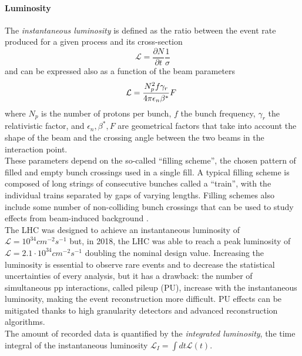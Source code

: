 \paragraph*{Luminosity}
The \emph{instantaneous luminosity} is defined as the ratio between the event rate produced for a given process and its cross-section
\begin{equation}
    \mathcal{L} = \frac{\partial N}{\partial t} \frac{1}{\sigma} 
\end{equation}
and can be expressed also as a function of the beam parameters
\begin{equation}
    \mathcal{L}=\frac{N_{p}^{2}f\gamma_{r}}{4\pi\epsilon_{n}\beta\sp{\ast}}F\ 
\end{equation}
where $N_p$ is the number of protons per bunch, $f$ the bunch frequency, $\gamma_r$ the relativistic factor, and $\epsilon_n, \beta^*, F$ are geometrical factors that take into account the shape of the beam and the crossing angle between the two beams in the interaction point.\\
These parameters depend on the so-called “filling scheme”, the chosen pattern of filled and empty bunch crossings used in a single fill.
A typical filling scheme is composed of long strings of consecutive bunches called a “train”, with the individual trains separated by gaps of varying lengths. Filling schemes also include some number of non-colliding bunch crossings that can be used to study effects from beam-induced background \cite{CMSCollaboration2021PrecisionCMS}.\\
The LHC was designed to achieve an instantaneous luminosity of $\mathcal{L}=10^{34} cm^{-2}s^{-1}$ but, in 2018, the LHC was able to reach a peak luminosity of $\mathcal{L}=2.1 \cdot 10^{34} cm^{-2}s^{-1}$ doubling the nominal design value. Increasing the luminosity is essential to observe rare events and to decrease the statistical uncertainties of every analysis, but it has a drawback: the number of simultaneous pp interactions, called pileup (PU), increase with the instantaneous luminosity, making the event reconstruction more difficult. PU effects can be mitigated thanks to high granularity detectors and advanced reconstruction algorithms.\\
The amount of recorded data is quantified by the \emph{integrated luminosity}, the time integral of the instantaneous luminosity $\mathcal{L}_I=\int dt \mathcal{L}(t)$.


